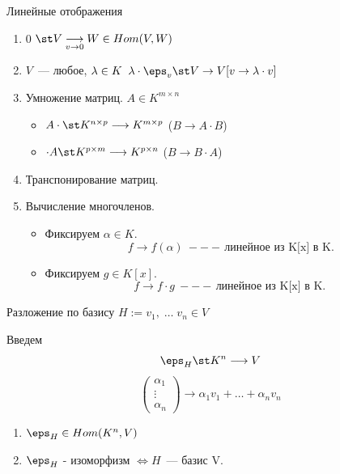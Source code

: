\begin{Example}{Линейные отображения}{}
    \begin{enumerate} \setlength{\itemsep}{6pt}
        \item 0 $ \st V \underset{v \rightarrow 0}{\longrightarrow} W \in Hom(V, W)$
        \item $V$~--- любое, $\lambda \in K \;\; \lambda \cdot \eps_v \st V \rightarrow V [v \rightarrow \lambda \cdot v]$
        \item Умножение матриц. $A \in K^{m \times n}$ 
        \begin{itemize}
            \item $A \cdot \st K^{n \times p} \longrightarrow K^{m \times p}$
            ($B \longrightarrow A \cdot B$)
            \item $\cdot A \st K^{p \times m} \longrightarrow K^{p \times n}$
            ($B \longrightarrow B \cdot A$)
        \end{itemize}
        \item Транспонирование матриц.
        \item Вычисление многочленов. 
        \begin{itemize}
            \item Фиксируем $\alpha \in K$.
            \[
                \ f \longrightarrow f(\alpha)~--- \, \text{линейное из K[x] в K.}
            \]
            \item Фиксируем $g \in K[x]$. 
            \[
                f \longrightarrow f \cdot g~--- \, \text{линейное из K[x] в K.}
            \]
        \end{itemize}
    \end{enumerate}
\end{Example}

\begin{Proposition}{Разложение по базису}{}
    $H := v_1 , \; \ldots \; v_n \in V$
    
    Введем 
    \[
    \eps_H \st K^n \longrightarrow V
    \]
    \[    
    \begin{pmatrix} \alpha_1 \\ \vdots \\ \alpha_n \end{pmatrix} \longrightarrow 
    \alpha_1v_1 + \ldots + \alpha_nv_n
    \]

    \begin{enumerate} \setlength{\itemsep}{7pt}
        \item $\eps_H \in Hom(K^n, V)$
        \item $\eps_H$ - изоморфизм $\Leftrightarrow H$~--- базис V.
    \end{enumerate}
\end{Proposition}


